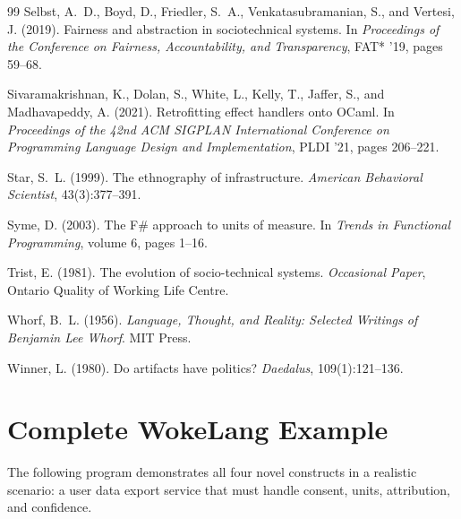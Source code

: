 \documentclass[11pt,a4paper]{article}
\begin{document}
\begin{thebibliography}{99}
Selbst, A.~D., Boyd, D., Friedler, S.~A., Venkatasubramanian, S., and
  Vertesi, J. (2019).
\newblock Fairness and abstraction in sociotechnical systems.
\newblock In \emph{Proceedings of the Conference on Fairness, Accountability,
  and Transparency}, FAT* '19, pages 59--68.

Sivaramakrishnan, K., Dolan, S., White, L., Kelly, T., Jaffer, S., and
  Madhavapeddy, A. (2021).
\newblock Retrofitting effect handlers onto {OCaml}.
\newblock In \emph{Proceedings of the 42nd ACM SIGPLAN International Conference
  on Programming Language Design and Implementation}, PLDI '21, pages 206--221.

Star, S.~L. (1999).
\newblock The ethnography of infrastructure.
\newblock \emph{American Behavioral Scientist}, 43(3):377--391.

Syme, D. (2003).
\newblock The {F\#} approach to units of measure.
\newblock In \emph{Trends in Functional Programming}, volume 6, pages 1--16.

Trist, E. (1981).
\newblock The evolution of socio-technical systems.
\newblock \emph{Occasional Paper}, Ontario Quality of Working Life Centre.

Whorf, B.~L. (1956).
\newblock \emph{Language, Thought, and Reality: Selected Writings of Benjamin
  Lee Whorf}.
\newblock MIT Press.

Winner, L. (1980).
\newblock Do artifacts have politics?
\newblock \emph{Daedalus}, 109(1):121--136.

\end{thebibliography}

\appendix

\section{Complete WokeLang Example}
\label{app:complete-example}

The following program demonstrates all four novel constructs in a
realistic scenario: a user data export service that must handle
consent, units, attribution, and confidence.
\end{document}
